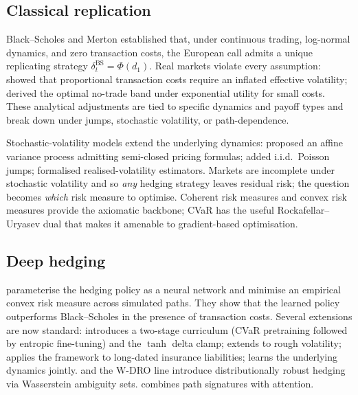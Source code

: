 \documentclass[11pt,a4paper]{article}
\begin{document}
\subsection{Classical replication}

Black--Scholes \citep{black1973pricing} and Merton \citep{merton1973theory}
established that, under continuous trading, log-normal dynamics, and zero
transaction costs, the European call admits a unique replicating strategy
$\delta_t^{\mathrm{BS}} = \Phi(d_1)$.  Real markets violate every
assumption: \citet{leland1985option} showed that proportional transaction
costs require an inflated effective volatility; \citet{whalley1997asymptotic}
derived the optimal no-trade band under exponential utility for small costs.
These analytical adjustments are tied to specific dynamics and payoff types
and break down under jumps, stochastic volatility, or path-dependence.

Stochastic-volatility models extend the underlying dynamics:
\citet{heston1993closed} proposed an affine variance process admitting
semi-closed pricing formulas; \citet{bates1996jumps} added i.i.d.\ Poisson
jumps; \citet{barndorff2002econometric} formalised realised-volatility
estimators.  Markets are incomplete under stochastic volatility and so
\emph{any} hedging strategy leaves residual risk; the question becomes
\emph{which} risk measure to optimise.  Coherent risk measures
\citep{artzner1999coherent} and convex risk measures
\citep{follmer2002convex} provide the axiomatic backbone; CVaR has the
useful Rockafellar--Uryasev dual \citep{rockafellar2000optimization} that
makes it amenable to gradient-based optimisation.

\subsection{Deep hedging}

\citet{buehler2019deep} parameterise the hedging policy as a neural
network and minimise an empirical convex risk measure across simulated
paths.  They show that the learned policy outperforms Black--Scholes in
the presence of transaction costs.  Several extensions are now standard:
\citet{kozyra2019deep} introduces a two-stage curriculum (CVaR pretraining
followed by entropic fine-tuning) and the $\tanh$ delta clamp;
\citet{horvath2021deep} extends to rough volatility;
\citet{carbonneau2021deep} applies the framework to long-dated insurance
liabilities; \citet{wiese2020deep} learns the underlying dynamics jointly.
\citet{lutkebohmert2021robust} and the W-DRO line \citep{blanchet2019quantifying,
esfahani2018data,rahimian2019distributionally} introduce distributionally
robust hedging via Wasserstein ambiguity sets.  \citet{tong2023sigformer}
combines path signatures \citep{lyons1998differential,kidger2020signatory}
with attention.
\end{document}
